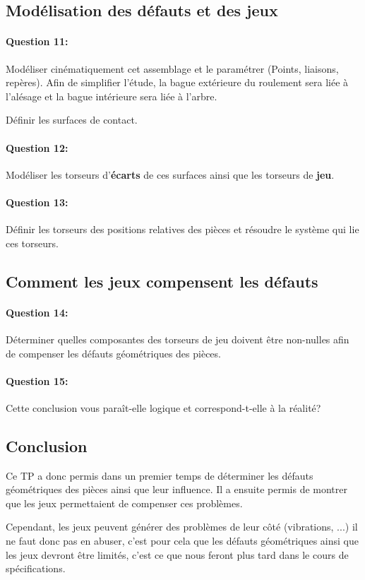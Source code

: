 \subsection{Modélisation des défauts et des jeux}

\paragraph{Question 11:} Modéliser cinématiquement cet assemblage et le paramétrer (Points, liaisons, repères). Afin de simplifier l'étude, la bague extérieure du roulement sera liée à l'alésage et la bague intérieure sera liée à l'arbre.

Définir les surfaces de contact.

\paragraph{Question 12:} Modéliser les torseurs d'\textbf{écarts} de ces surfaces ainsi que les torseurs de \textbf{jeu}.

\reponse[8]

\paragraph{Question 13:} Définir les torseurs des positions relatives des pièces et résoudre le système qui lie ces torseurs.

\reponse[8]

\subsection{Comment les jeux compensent les défauts}

\paragraph{Question 14:} Déterminer quelles composantes des torseurs de jeu doivent être non-nulles afin de compenser les défauts géométriques des pièces.

\reponse[4]

\paragraph{Question 15:} Cette conclusion vous paraît-elle logique et correspond-t-elle à la réalité?

\reponse[2]

\subsection{Conclusion}

Ce TP a donc permis dans un premier temps de déterminer les défauts géométriques des pièces ainsi que leur influence. Il a ensuite permis de montrer que les jeux permettaient de compenser ces problèmes.

Cependant, les jeux peuvent générer des problèmes de leur côté (vibrations, ...) il ne faut donc pas en abuser, c'est pour cela que les défauts géométriques ainsi que les jeux devront être limités, c'est ce que nous feront plus tard dans le cours de spécifications.



